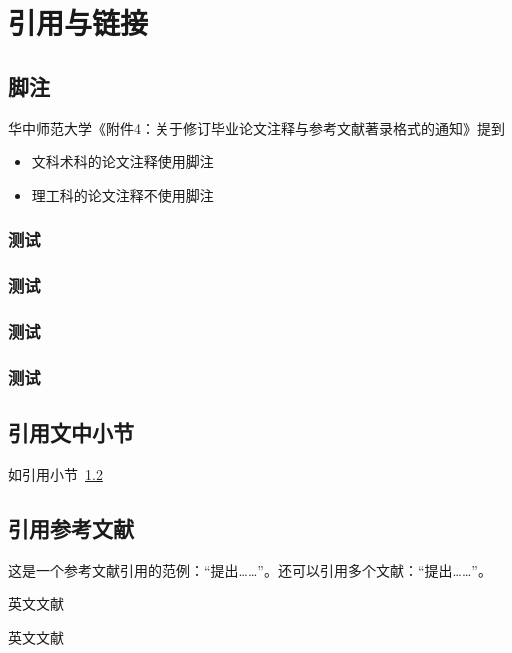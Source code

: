 
\chapter{引用与链接}

\section{脚注}

华中师范大学《附件4：关于修订毕业论文注释与参考文献著录格式的通知》提到

\begin{itemize}
  \item 文科术科的论文注释使用脚注
  \item 理工科的论文注释不使用脚注
\end{itemize}

\subsection{测试}
\subsection{测试}
\subsection{测试}
\subsection{测试}

\zhlipsum[1]



\section{引用文中小节}\label{sec:ref}

如引用小节~\ref{sec:ref}



\section{引用参考文献}

这是一个参考文献引用的范例：“\parencite{邱泽奇建构与分化}提出……”。还可以引用多个文献：“\parencite{丁文祥rawtype,李晓东rawtype}提出……”。

英文文献 \parencite{feynman2011}

英文文献 \parencite[12]{feynman2011}

